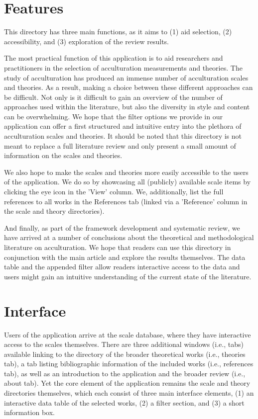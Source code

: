 \documentclass[man, 12pt, a4paper]{apa7}
\begin{document}
\section{Features}
This directory has three main functions, as it aims to (1) aid selection, (2) accessibility, and (3) exploration of the review results.

The most practical function of this application is to aid researchers and practitioners in the selection of acculturation measurements and theories. The study of acculturation has produced an immense number of acculturation scales and theories. As a result, making a choice between these different approaches can be difficult. Not only is it difficult to gain an overview of the number of approaches used within the literature, but also the diversity in style and content can be overwhelming. We hope that the filter options we provide in our application can offer a first structured and intuitive entry into the plethora of acculturation scales and theories. It should be noted that this directory is not meant to replace a full literature review and only present a small amount of information on the scales and theories.

We also hope to make the scales and theories more easily accessible to the users of the application. We do so by showcasing all (publicly) available scale items by clicking the eye icon in the 'View' column. We, additionally, list the full references to all works in the References tab (linked via a 'Reference' column in the scale and theory directories). 

And finally, as part of the framework development and systematic review, we have arrived at a number of conclusions about the theoretical and methodological literature on acculturation. We hope that readers can use this directory in conjunction with the main article and explore the results themselves. The data table and the appended filter allow readers interactive access to the data and users might gain an intuitive understanding of the current state of the literature.


\section{Interface}
Users of the application arrive at the scale database, where they have interactive access to the scales themselves. There are three additional windows (i.e., tabs) available linking to the directory of the broader theoretical works (i.e., theories tab), a tab listing bibliographic information of the included works (i.e., references tab), as well as an introduction to the application and the broader review (i.e., about tab). Yet the core element of the application remains the scale and theory directories themselves, which each consist of three main interface elements, (1) an interactive data table of the selected works, (2) a filter section, and (3) a short information box.
\end{document}
